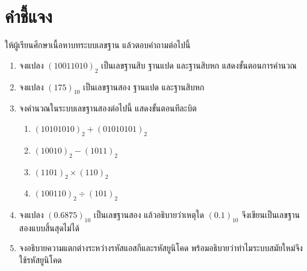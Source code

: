 \section*{คำชี้แจง} ให้ผู้เรียนศึกษาเนื้อหาบทระบบเลขฐาน แล้วตอบคำถามต่อไปนี้
\begin{enumerate}
    \item จงแปลง $(10011010)_2$ เป็นเลขฐานสิบ ฐานแปด และฐานสิบหก แสดงขั้นตอนการคำนวณ
    \item จงแปลง $(175)_{10}$ เป็นเลขฐานสอง ฐานแปด และฐานสิบหก
    \item จงคำนวณในระบบเลขฐานสองต่อไปนี้ แสดงขั้นตอนทีละบิต
    \begin{enumerate}[label=(\alph*)]
        \item $(10101010)_2 + (01010101)_2$
        \item $(10010)_2 - (1011)_2$
        \item $(1101)_2 \times (110)_2$
        \item $(100110)_2 \div (101)_2$
    \end{enumerate}
    \item จงแปลง $(0.6875)_{10}$ เป็นเลขฐานสอง แล้วอธิบายว่าเหตุใด $(0.1)_{10}$ จึงเขียนเป็นเลขฐานสองแบบสิ้นสุดไม่ได้
    \item จงอธิบายความแตกต่างระหว่างรหัสแอสกีและรหัสยูนิโคด พร้อมอธิบายว่าทำไมระบบสมัยใหม่จึงใช้รหัสยูนิโคด
\end{enumerate}
